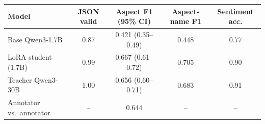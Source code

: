 \begin{tabular}{lcccc}
\toprule
Model & JSON valid & Aspect F1 (95\% CI) & Aspect-name F1 & Sentiment acc. \\
\midrule
Base Qwen3-1.7B & 0.87 & 0.421 (0.35--0.49) & 0.448 & 0.77 \\
LoRA student (1.7B) & 0.99 & 0.667 (0.61--0.72) & 0.705 & 0.90 \\
Teacher Qwen3-30B & 1.00 & 0.656 (0.60--0.71) & 0.683 & 0.91 \\
\midrule
Annotator vs.\ annotator & -- & 0.644 & -- & -- \\
\bottomrule
\end{tabular}
